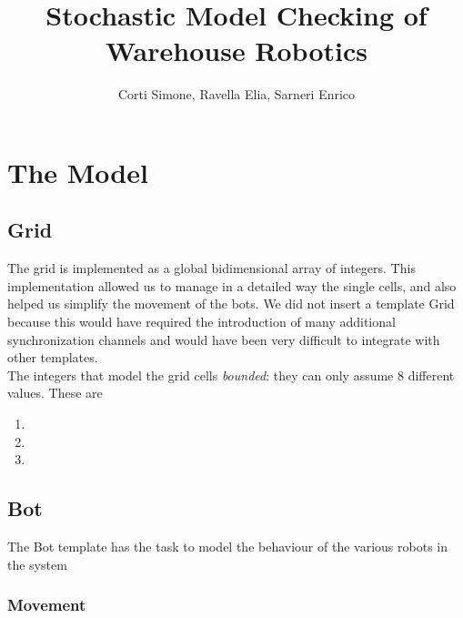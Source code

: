 \documentclass[10pt,a4paper]{article}
\title{Stochastic Model Checking of Warehouse Robotics}
\author{Corti Simone, Ravella Elia, Sarneri Enrico}
\begin{document}
	\begin{titlepage}
		\maketitle
	\end{titlepage}
	
	\section{The Model}
		\subsection{Grid}
			The grid is implemented as a global bidimensional array of integers. This implementation allowed us to manage in a detailed way the single cells, and also helped us simplify the movement of the bots. We did not insert a template Grid because this would have required the introduction of many additional synchronization channels and would have been very difficult to integrate with other templates.\\
			The integers that model the grid cells \emph{bounded}: they can only assume 8 different values. These are
			\begin{enumerate}[start=0, label={\arabic* :}]
				\item 
				\item 
				\item
			\end{enumerate}
		
		\subsection{Bot}
			The Bot template has the task to model the behaviour of the various robots in the system
			\subsubsection{Movement}
		
\end{document}
